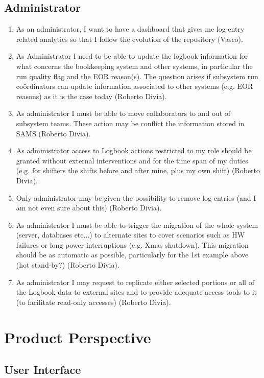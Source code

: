 \documentclass[a4paper,11pt]{book}
\begin{document}
\subsection{Administrator}
\begin{enumerate}
  \item As an administrator, I want to have a dashboard that gives me log-entry related analytics so that I follow the evolution of the repository (Vasco). 
  \item As Administrator I need to be able to update the logbook information for what concerns the bookkeeping system and other systems, in particular the run quality flag and the EOR reason(s). The question arises if subsystem run co\"ordinators can update information associated to other systems (e.g. EOR reasons) as it is the case today (Roberto Divia).
  \item As administrator I must be able to move collaborators to and out of subsystem teams. These action may be conflict the information stored in SAMS (Roberto Divia).
    \item As administrator access to Logbook actions restricted to my role should be granted without external interventions and for the time span of my duties (e.g. for shifters the shifts before and after mine, plus my own shift) (Roberto Divia).
  \item Only administrator may be given the possibility to remove log entries (and I am not even sure about this) (Roberto Divia).
\item As administrator I must be able to trigger the migration of the whole system (server, databases etc...) to alternate sites to cover scenarios such as HW failures or long power interruptions (e.g. Xmas shutdown). This migration should be as automatic as possible, particularly for the 1st example above (hot stand-by?) (Roberto Divia).
  \item As administrator I may request to replicate either selected portions or all of the Logbook data to external sites and to provide adequate access tools to it (to facilitate read-only accesses) (Roberto Divia).

\end{enumerate}

\section{Product Perspective}
\subsection{User Interface}
\end{document}
